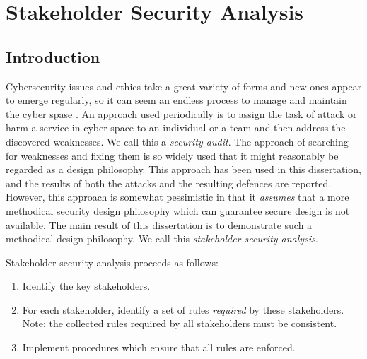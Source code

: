 \chapter{Stakeholder Security Analysis}
\section{Introduction}
\thispagestyle{empty}
\pagestyle{empty}
% 
% 
% 
% 


Cybersecurity issues and ethics  take a great variety of forms and new ones appear to emerge regularly, so it can seem an endless process to manage and maintain the cyber spase \cite{josang2005user}. An approach used periodically is to assign the task of attack or harm   a service in cyber space  to an individual or a team and then address the discovered weaknesses. We call this a {\em security audit}. The approach of searching for weaknesses and fixing them is so widely used that it might reasonably be regarded as a design philosophy.
This approach has been used in this dissertation, and the results of
both the attacks and the resulting defences are reported.
However, this approach is somewhat pessimistic in that it {\em assumes}
that a more methodical security design philosophy which can guarantee
secure design is not available. The main result
of this dissertation is to demonstrate such a methodical design philosophy.
We call this {\em stakeholder security analysis}.

Stakeholder security analysis proceeds as follows: 
\begin{enumerate}[1.]
\item Identify the key stakeholders.
\item For each stakeholder, identify a set of rules {\em required}
by these stakeholders. Note: the collected rules required
by all stakeholders must be consistent.
\item Implement procedures which ensure that all rules are enforced.
\end{enumerate}

